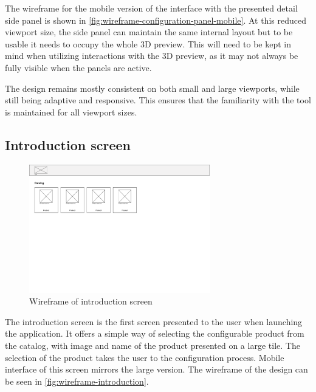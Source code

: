 The wireframe for the mobile version of the interface with the presented detail side panel is shown in \autoref{fig:wireframe-configuration-panel-mobile}. At this reduced viewport size, the side panel can maintain the same internal layout but to be usable it needs to occupy the whole 3D preview. This will need to be kept in mind when utilizing interactions with the 3D preview, as it may not always be fully visible when the panels are active. 

The design remains mostly consistent on both small and large viewports, while still being adaptive and responsive. This ensures that the familiarity with the tool is maintained for all viewport sizes.

\subsection{Introduction screen}

\begin{figure}[h]
\centering
\includegraphics[width=0.7\textwidth]{images/wireframe_introduction_default.png}
\caption{Wireframe of introduction screen}
\label{fig:wireframe-introduction}
\end{figure}

The introduction screen is the first screen presented to the user when launching the application. It offers a simple way of selecting the configurable product from the catalog, with image and name of the product presented on a large tile. The selection of the product takes the user to the configuration process. Mobile interface of this screen mirrors the large version. The wireframe of the design can be seen in \autoref{fig:wireframe-introduction}.

